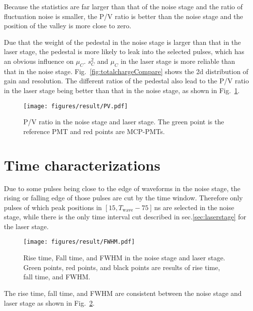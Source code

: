 Because the statistics are far larger than that of the noise stage and the ratio of fluctuation noise is smaller, the P/V ratio is better than the noise stage and the position of the valley is more close to zero. 

Due that the weight of the pedestal in the noise stage is larger than that in the laser stage, the pedestal is more likely to leak into the selected pulses, which has an obvious influence on $\mu_{C}$. $s^2_{C}$ and $\mu_{C}$ in the laser stage is more reliable than that in the noise stage. Fig.~\ref{fig:totalchargeCompare} shows the 2d distribution of gain and resolution.
The different ratios of the pedestal also lead to the P/V ratio in the laser stage being better than that in the noise stage, as shown in Fig.~\ref{fig:PVCompare}.
\begin{figure}[!htbp]
    \centering
    \texttt{[image: figures/result/PV.pdf]}
    \caption{P/V ratio in the noise stage and laser stage. The green point is the reference PMT and red points are MCP-PMTs.} 
    \label{fig:PVCompare}
\end{figure}

\section{Time characterizations}
Due to some pulses being close to the edge of waveforms in the noise stage, the rising or falling edge of those pulses are cut by the time window. Therefore only pulses of which peak positions in $[15, T_{\mathrm{wave}}-75]$\,ns are selected in the noise stage, while there is the only time interval cut described in sec.\ref{sec:laserstage} for the laser stage.


\begin{figure}[!htbp]
    \centering
    \texttt{[image: figures/result/FWHM.pdf]}
    \caption{Rise time, Fall time, and FWHM in the noise stage and laser stage. Green points, red points, and black points are results of rise time, fall time, and FWHM.}
    \label{fig:RiseCompare}
\end{figure}
The rise time, fall time, and FWHM are consistent between the noise stage and laser stage as shown in Fig.~\ref{fig:RiseCompare}. 

